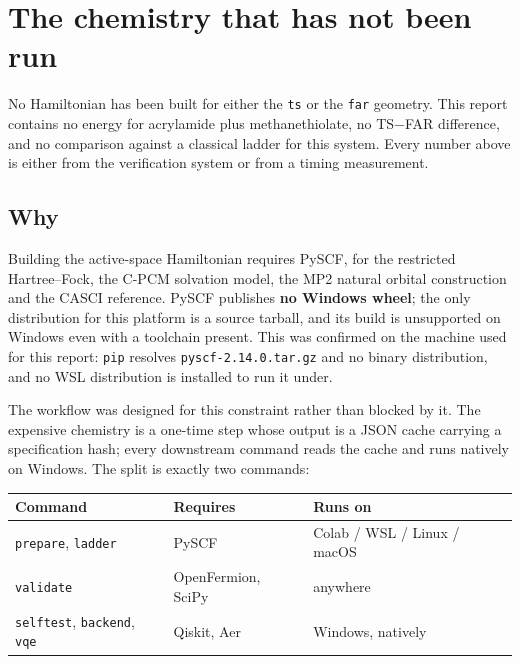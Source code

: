 \documentclass[11pt,a4paper]{article}
\newcommand{\code}[1]{\texttt{\small #1}}
\begin{document}
\section{The chemistry that has not been run}
\label{sec:pending}

\begin{unsupported}
No Hamiltonian has been built for either the \code{ts} or the \code{far}
geometry. This report contains no energy for acrylamide plus methanethiolate, no
TS$-$FAR difference, and no comparison against a classical ladder for this
system. Every number above is either from the verification system or from a
timing measurement.
\end{unsupported}

\subsection{Why}

Building the active-space Hamiltonian requires PySCF, for the restricted
Hartree--Fock, the C-PCM solvation model, the MP2 natural orbital construction
and the CASCI reference. PySCF publishes \textbf{no Windows wheel}; the only
distribution for this platform is a source tarball, and its build is unsupported
on Windows even with a toolchain present. This was confirmed on the machine used
for this report: \code{pip} resolves \code{pyscf-2.14.0.tar.gz} and no binary
distribution, and no WSL distribution is installed to run it under.

The workflow was designed for this constraint rather than blocked by it. The
expensive chemistry is a one-time step whose output is a JSON cache carrying a
specification hash; every downstream command reads the cache and runs natively
on Windows. The split is exactly two commands:

\begin{center}
\small
\begin{tabular}{lll}
\toprule
Command & Requires & Runs on \\
\midrule
\code{prepare}, \code{ladder} & PySCF & Colab / WSL / Linux / macOS \\
\code{validate} & OpenFermion, SciPy & anywhere \\
\code{selftest}, \code{backend}, \code{vqe} & Qiskit, Aer & Windows, natively \\
\bottomrule
\end{tabular}
\end{center}
\end{document}
